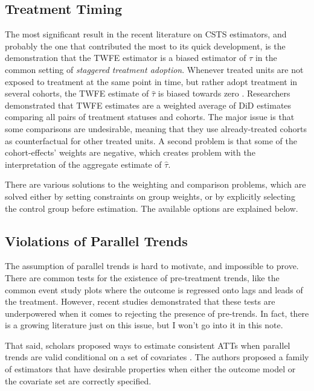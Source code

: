 \documentclass[hidelinks]{article}\usepackage[]{graphicx}\usepackage[]{color}
\begin{document}
\subsection{Treatment Timing}

The most significant result in the recent literature on CSTS estimators, and probably the one that contributed the most to its quick development, is the demonstration that the TWFE estimator is a biased estimator of $\tau$ in the common setting of \textit{staggered treatment adoption}. Whenever treated units are not exposed to treatment at the same point in time, but rather adopt treatment in several cohorts, the TWFE estimate of $\hat{\tau}$ is biased towards zero \parencite{GoodmanBacon2021, Callaway2021}. Researchers demonstrated that TWFE estimates are a weighted average of DiD estimates comparing all pairs of treatment statuses and cohorts. The major issue is that some comparisons are undesirable, meaning that they use already-treated cohorts as counterfactual for other treated units. A second problem is that some of the cohort-effects' weights are negative, which creates problem with the interpretation of the aggregate estimate of $\hat{\tau}$. 

There are various solutions to the weighting and comparison problems, which are solved either by setting constraints on group weights, or by explicitly selecting the control group before estimation. The available options are explained below.

\subsection{Violations of Parallel Trends}

The assumption of parallel trends is hard to motivate, and impossible to prove. There are common tests for the existence of pre-treatment trends, like the common event study plots where the outcome is regressed onto lags and leads of the treatment. However, recent studies demonstrated that these tests are underpowered when it comes to rejecting the presence of pre-trends. In fact, there is a growing literature just on this issue, but I won't go into it in this note.

That said, scholars proposed ways to estimate consistent ATTs when parallel trends are valid conditional on a set of covariates \parencite{SantAnna2020}. The authors proposed a family of estimators that have desirable properties when either the outcome model or the covariate set are correctly specified.
\end{document}
